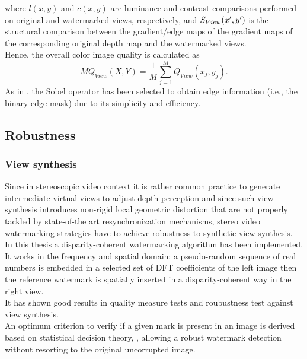 where $l(x,y)$ and $c(x,y)$ are luminance and contrast comparisons performed on original and watermarked views, respectively, and $\mathnormal{S}_{View}(x',y')$  is the structural comparison between the gradient/edge maps of the gradient maps of the corresponding original depth map and the watermarked views.\\
Hence, the overall color image quality is calculated as
\begin{equation}
MQ_{View}(X,Y) = \frac{1}{M} \sum_{j=1}^{M}Q_{View}(x_{j},y_{j}).
\end{equation}
As in \cite{QMETRICS}, the Sobel operator has been selected to obtain edge information (i.e., the binary edge mask) due to its simplicity and efficiency.\\

\subsection{Robustness}
\subsubsection{View synthesis}
Since in stereoscopic video context it is rather common practice to generate intermediate virtual views to adjust depth perception and since such view synthesis introduces non-rigid local geometric distortion that are not properly tackled by state-of-the art resynchronization mechanisms, stereo video watermarking strategies have to achieve robustness to synthetic view synthesis.\\


In this thesis a disparity-coherent watermarking algorithm has been implemented. It works in the frequency and spatial domain: a pseudo-random sequence of real numbers is embedded in a selected set of DFT coefficients of the left image then  the reference watermark is spatially inserted in a disparity-coherent way in the right view.\\
It has shown good results in quality measure tests and roubustness test against view synthesis.\\
An optimum criterion to verify if a given mark is present in an image is derived based on statistical decision theory, \cite{STAT}, allowing a robust watermark detection without resorting to the original uncorrupted image.\\







